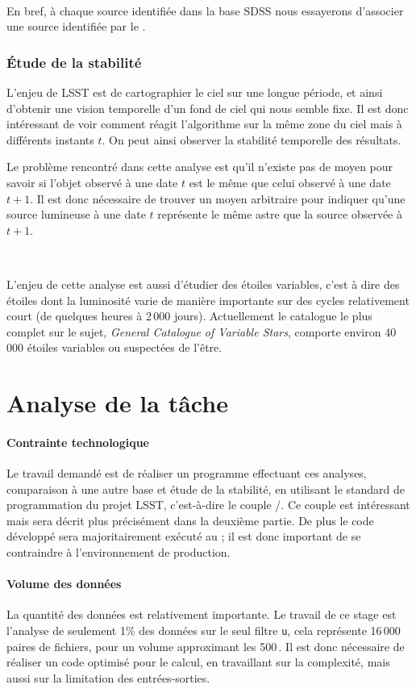 \

En bref, à chaque source identifiée dans la base SDSS nous essayerons d'associer une source identifiée par le \stack.

		\subsubsection{Étude de la stabilité}
L'enjeu de LSST est de cartographier le ciel sur une longue période, et ainsi d'obtenir une vision temporelle d'un fond de ciel qui nous semble fixe. Il est donc intéressant de voir comment réagit l'algorithme sur la même zone du ciel mais à différents instants $t$. On peut ainsi observer la stabilité temporelle des résultats.

Le problème rencontré dans cette analyse est qu'il n'existe pas de moyen pour savoir si l'objet observé à une date $t$ est le même que celui observé à une date $t+1$. Il est donc nécessaire de trouver un moyen arbitraire pour indiquer qu'une source lumineuse à une date $t$ représente le même astre que la source observée à $t+1$.

\

L'enjeu de cette analyse est aussi d'étudier des étoiles variables, c'est à dire des étoiles dont la luminosité varie de manière importante sur des cycles relativement court (de quelques heures à 2\,000 jours). Actuellement le catalogue le plus complet sur le sujet, \emph{General Catalogue of Variable Stars}, comporte environ 40\,000 étoiles variables ou suspectées de l'être.


\section{Analyse de la tâche}

			\paragraph{Contrainte technologique}
Le travail demandé est de réaliser un programme effectuant ces analyses, comparaison à une autre base et étude de la stabilité, en utilisant le standard de programmation du projet LSST, c'est-à-dire le couple \Python/\Cpp. Ce couple est intéressant mais sera décrit plus précisément dans la deuxième partie. De plus le code développé sera majoritairement exécuté au \CC{} ; il est donc important de se contraindre à l'environnement de production.

			\paragraph{Volume des données}
La quantité des données est relativement importante. Le travail de ce stage est l'analyse de seulement 1\% des données sur le seul filtre \texttt{u}, cela représente 16\,000 paires de fichiers, pour un volume approximant les 500\,\Go. Il est donc nécessaire de réaliser un code optimisé pour le calcul, en travaillant sur la complexité, mais aussi sur la limitation des entrées-sorties.

